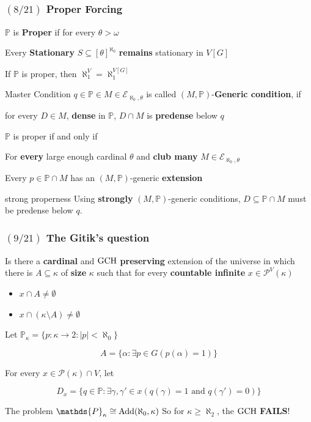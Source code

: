 \documentclass{beamer}
\newcommand{\p}{\mathds{P}}
\newcommand{\gch}{\rm{GCH}}
\newcommand{\prg}[1]{#1[G]}
\newcommand{\add}[2]{{\rm{Add}}(#1, #2)}
\newcommand{\el}[1]{\mathcal{E}_{\aleph_0, #1}}
\begin{document}
\begin{frame}
\frametitle{$(8/21)$ \hspace{20mm} Proper Forcing}
\begin{definition}
$\p$ is \textbf{Proper} if for every $\theta > \omega$

Every \textbf{Stationary} $S \subseteq [\theta]^{\aleph_0}$ \textbf{remains} stationary in $\prg{V}$
\end{definition}
\vspace{-3mm}\pause
\begin{alertblock}{}
If $\p$ is proper, then $\aleph_1^V=\aleph_1^{\prg{V}}$
\end{alertblock}
\vspace{-2mm}\pause
\begin{alertblock}{Master Condition}
$q \in \p \in M \in \el{\theta}$ is called $(M, \p)$-\textbf{Generic condition}, if

for every $D \in M$, \textbf{dense} in $\p$, $D \cap M$ is \textbf{predense} below $q$
\end{alertblock}
\vspace{-2mm}\pause
\begin{theorem}
$\p$ is proper if and only if

For \textbf{every} large enough cardinal $\theta$ and \textbf{club many} $M \in \el{\theta}$

Every $p \in \p \cap M$ has an $(M, \p)$-generic \textbf{extension}
\end{theorem}
\vspace{-2mm}\pause
\begin{block}{strong properness}
Using \textbf{strongly} $(M, \mathds{P})$-generic conditions,  $D \subseteq \mathds{P} \cap M$ must be predense below $q$.
\end{block}
\end{frame}
\begin{frame}
\frametitle{$(9/21)$ \hspace{20mm} The Gitik's question}
Is there a \textbf{cardinal} and $\gch$ \textbf{preserving} extension of the universe in which there is $A \subseteq \kappa$ of \textbf{size} $\kappa$ such that for every \textbf{countable infinite} $x \in \mathcal{P}^V(\kappa)$
\begin{itemize}
\item $x \cap A \neq \emptyset$
\item  $x \cap (\kappa \setminus A)\neq \emptyset$
\end{itemize}
\pause
\begin{alertblock}{}
Let $\p_{\kappa}=\lbrace p \colon \kappa \longrightarrow 2 \colon |p|<\aleph_0 \rbrace$

$$A=\lbrace \alpha \colon \exists p \in G (p(\alpha)=1)\rbrace$$
\end{alertblock}
For every $x \in \mathcal{P}(\kappa) \cap V$, let

$$D_x= \lbrace q \in \p \colon \exists \gamma, \gamma' \in x (q(\gamma)=1 \text{ and }q(\gamma')=0)\rbrace$$
\pause
\begin{alertblock}{The problem}
$\p_{\kappa} \cong \add{\aleph_0}{\kappa}$ So for $\kappa \geq \aleph_2$, the $\gch$ \textbf{FAILS}!
\end{alertblock}
\end{frame}
\end{document}
